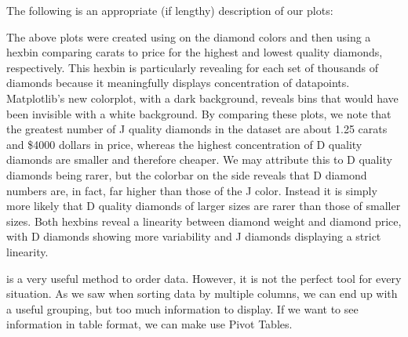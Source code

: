 \begin{problem}

The following is an appropriate (if lengthy) description of our plots:

The above plots were created using  on the diamond colors and then using a hexbin comparing carats to price for the highest and lowest quality diamonds, respectively. 
This hexbin is particularly revealing for each set of thousands of diamonds because it meaningfully displays concentration of datapoints. 
Matplotlib's new  colorplot, with a dark background, reveals bins that would have been invisible with a white background.
By comparing these plots, we note that the greatest number of J quality diamonds in the dataset are about 1.25 carats and \$4000 dollars in price, whereas the highest concentration of D quality diamonds are smaller and therefore cheaper. 
We may attribute this to D quality diamonds being rarer, but the colorbar on the side reveals that D diamond numbers are, in fact, far higher than those of the J color. 
Instead it is simply more likely that D quality diamonds of larger sizes are rarer than those of smaller sizes. 
Both hexbins reveal a linearity between diamond weight and diamond price, with D diamonds showing more variability and J diamonds displaying a strict linearity.

\end{problem}

 is a very useful method to order data.  However, it is not the perfect tool for every situation.  As we saw when sorting data by multiple columns, we can end up with a useful grouping, but too much information to display.  If we want to see information in table format, we can make use Pivot Tables.

